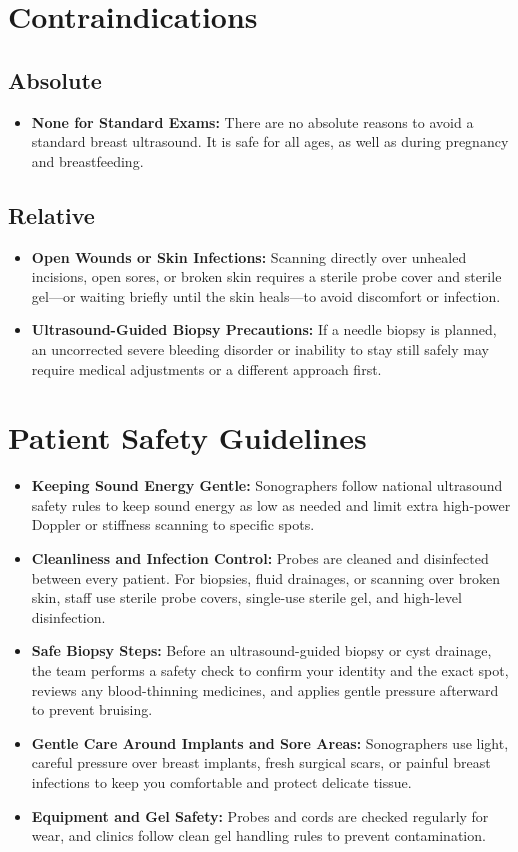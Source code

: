 \section{Contraindications}

\subsection{Absolute}
\begin{itemize}
\item \textbf{None for Standard Exams:} There are no absolute reasons to avoid a standard breast ultrasound. It is safe for all ages, as well as during pregnancy and breastfeeding.
\end{itemize}

\subsection{Relative}
\begin{itemize}
\item \textbf{Open Wounds or Skin Infections:} Scanning directly over unhealed incisions, open sores, or broken skin requires a sterile probe cover and sterile gel---or waiting briefly until the skin heals---to avoid discomfort or infection.
\item \textbf{Ultrasound-Guided Biopsy Precautions:} If a needle biopsy is planned, an uncorrected severe bleeding disorder or inability to stay still safely may require medical adjustments or a different approach first.
\end{itemize}

\section{Patient Safety Guidelines}
\begin{itemize}
\item \textbf{Keeping Sound Energy Gentle:} Sonographers follow national ultrasound safety rules to keep sound energy as low as needed and limit extra high-power Doppler or stiffness scanning to specific spots.
\item \textbf{Cleanliness and Infection Control:} Probes are cleaned and disinfected between every patient. For biopsies, fluid drainages, or scanning over broken skin, staff use sterile probe covers, single-use sterile gel, and high-level disinfection.
\item \textbf{Safe Biopsy Steps:} Before an ultrasound-guided biopsy or cyst drainage, the team performs a safety check to confirm your identity and the exact spot, reviews any blood-thinning medicines, and applies gentle pressure afterward to prevent bruising.
\item \textbf{Gentle Care Around Implants and Sore Areas:} Sonographers use light, careful pressure over breast implants, fresh surgical scars, or painful breast infections to keep you comfortable and protect delicate tissue.
\item \textbf{Equipment and Gel Safety:} Probes and cords are checked regularly for wear, and clinics follow clean gel handling rules to prevent contamination.
\end{itemize}

